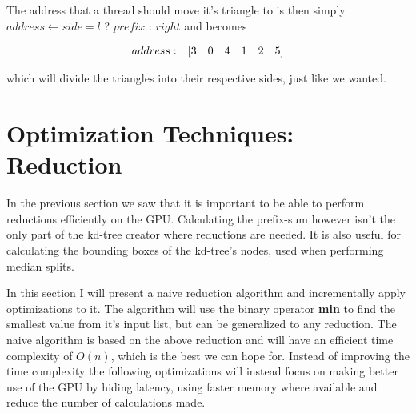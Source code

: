 The address that a thread should move it's triangle to is then simply
$address \leftarrow side = l$ ? $prefix$ : $right$ and becomes


\begin{displaymath}
  \begin{array} {r r r r r r r}
    address: & [3 & 0 & 4 & 1 & 2 & 5]
  \end{array}
\end{displaymath}

which will divide the triangles into their respective sides, just like
we wanted.










\section{Optimization Techniques: Reduction}\label{sec:reduce}


In the previous section we saw that it is important to be able to
perform reductions efficiently on the GPU. Calculating the prefix-sum
however isn't the only part of the kd-tree creator where reductions
are needed. It is also useful for calculating the bounding boxes of
the kd-tree's nodes, used when performing median splits.

In this section I will present a naive reduction algorithm and
incrementally apply optimizations to it. The algorithm will use the
binary operator \textbf{min} to find the smallest value from it's
input list, but can be generalized to any reduction. The naive
algorithm is based on the above reduction and will have an efficient
time complexity of $O(n)$, which is the best we can hope for. Instead
of improving the time complexity the following optimizations will
instead focus on making better use of the GPU by hiding latency, using
faster memory where available and reduce the number of calculations
made.

